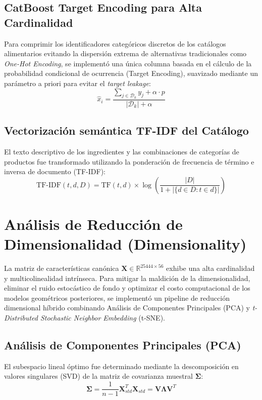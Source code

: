 \documentclass[11pt,a4paper]{article}
\begin{document}
\subsection{CatBoost Target Encoding para Alta Cardinalidad}
Para comprimir los identificadores categóricos discretos de los catálogos alimentarios evitando la dispersión extrema de alternativas tradicionales como \textit{One-Hot Encoding}, se implementó una única columna basada en el cálculo de la probabilidad condicional de ocurrencia (Target Encoding), suavizado mediante un parámetro a priori para evitar el \textit{target leakage}:
\begin{equation}
\hat{x}_{i} = \frac{\sum_{j \in \mathcal{D}_k} y_j + \alpha \cdot p}{\left|\mathcal{D}_k\right| + \alpha}
\end{equation}

\subsection{Vectorización semántica TF-IDF del Catálogo}
El texto descriptivo de los ingredientes y las combinaciones de categorías de productos fue transformado utilizando la ponderación de frecuencia de término e inversa de documento (TF-IDF):
\begin{equation}
\text{TF-IDF}(t, d, D) = \text{TF}(t, d) \times \log\left(\frac{|D|}{1 + |\{d \in D : t \in d\}|}\right)
\end{equation}

\section{Análisis de Reducción de Dimensionalidad (Dimensionality)}
La matriz de características canónica $\mathbf{X} \in \mathbb{R}^{25444 \times 56}$ exhibe una alta cardinalidad y multicolinealidad intrínseca. Para mitigar la maldición de la dimensionalidad, eliminar el ruido estocástico de fondo y optimizar el costo computacional de los modelos geométricos posteriores, se implementó un pipeline de reducción dimensional híbrido combinando Análisis de Componentes Principales (PCA) y \textit{t-Distributed Stochastic Neighbor Embedding} (t-SNE).

\subsection{Análisis de Componentes Principales (PCA)}
El subespacio lineal óptimo fue determinado mediante la descomposición en valores singulares (SVD) de la matriz de covarianza muestral $\mathbf{\Sigma}$:
\begin{equation}
\mathbf{\Sigma} = \frac{1}{n-1} \mathbf{X}_{std}^T \mathbf{X}_{std} = \mathbf{V} \mathbf{\Lambda} \mathbf{V}^T
\end{equation}
\end{document}

